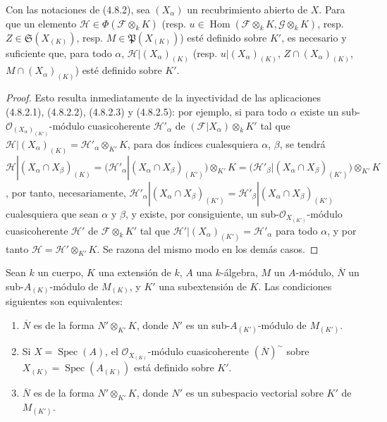 \begin{proposition}[4.8.5]
\label{IV.2.4.8.5-fr}
Con las notaciones de \textup{(4.8.2)}, sea $(X_\alpha)$ un recubrimiento abierto de
$X$. Para que un elemento $\mathscr H\in\Phi(\mathscr F\otimes_kK)$ \textup{(resp.}
$u\in\operatorname{Hom}(\mathscr F\otimes_kK,\mathscr G\otimes_kK)$, \textup{resp.}
$Z\in\mathfrak S(X_{(K)})$, \textup{resp.} $M\in\mathfrak P(X_{(K)})$\textup{)} esté definido
sobre $K'$, es necesario y suficiente que, para todo $\alpha$,
$\mathscr H|(X_\alpha)_{(K)}$ \textup{(resp.} $u|(X_\alpha)_{(K)}$,
$Z\cap(X_\alpha)_{(K)}$, $M\cap(X_\alpha)_{(K)}$\textup{)} esté definido sobre $K'$.
\end{proposition}

\begin{proof}
Esto resulta inmediatamente de la inyectividad de las aplicaciones (4.8.2.1),
(4.8.2.2), (4.8.2.3) y (4.8.2.5): por ejemplo, si para todo $\alpha$ existe un
sub-$\mathcal O_{(X_\alpha)_{(K')}}$-módulo cuasicoherente
$\mathscr H'_\alpha$ de $(\mathscr F|X_\alpha)\otimes_kK'$ tal que
$\mathscr H|(X_\alpha)_{(K)}=\mathscr H'_\alpha\otimes_{K'}K$, para dos
índices cualesquiera $\alpha$, $\beta$, se tendrá
$\mathscr H|(X_\alpha\cap X_\beta)_{(K)}
=\bigl(\mathscr H'_\alpha|(X_\alpha\cap X_\beta)_{(K')}\bigr)
 \otimes_{K'}K
=\bigl(\mathscr H'_\beta|(X_\alpha\cap X_\beta)_{(K')}\bigr)
 \otimes_{K'}K$,
por tanto, necesariamente,
$\mathscr H'_\alpha|(X_\alpha\cap X_\beta)_{(K')}
=\mathscr H'_\beta|(X_\alpha\cap X_\beta)_{(K')}$ cualesquiera que sean
$\alpha$ y $\beta$, y existe, por consiguiente, un
sub-$\mathcal O_{X_{(K')}}$-módulo cuasicoherente $\mathscr H'$ de
$\mathscr F\otimes_kK'$ tal que
$\mathscr H'|(X_\alpha)_{(K')}=\mathscr H'_\alpha$ para todo $\alpha$, y por
tanto $\mathscr H=\mathscr H'\otimes_{K'}K$. Se razona del mismo modo en los
demás casos.
\end{proof}

\begin{lemma}[4.8.6]
\label{IV.2.4.8.6-fr}
Sean $k$ un cuerpo, $K$ una extensión de $k$, $A$ una $k$-álgebra, $M$ un
$A$-módulo, $\overline N$ un sub-$A_{(K)}$-módulo de $M_{(K)}$, y $K'$ una
subextensión de $K$. Las condiciones siguientes son equivalentes:
\begin{enumerate}
\item[\textup{a)}] $\overline N$ es de la forma $N'\otimes_{K'}K$, donde $N'$ es un
sub-$A_{(K')}$-módulo de $M_{(K')}$.
\item[\textup{b)}] Si $X=\operatorname{Spec}(A)$, el
$\mathcal O_{X_{(K)}}$-módulo cuasicoherente $(\overline N)^{\sim}$ sobre
$X_{(K)}=\operatorname{Spec}(A_{(K)})$ está definido sobre $K'$.
\item[\textup{c)}] $\overline N$ es de la forma $N'\otimes_{K'}K$, donde $N'$ es un
subespacio vectorial sobre $K'$ de $M_{(K')}$.
\end{enumerate}
\end{lemma}

